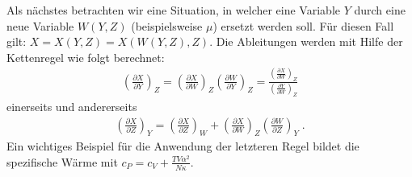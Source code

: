 Als nächstes betrachten wir eine Situation, in welcher eine Variable $Y$ durch eine neue Variable $W(Y,Z)$ (beispielsweise $\mu$) ersetzt werden soll.
Für diesen Fall gilt: $X=X(Y,Z)=X(W(Y,Z),Z)$. 	
Die Ableitungen werden mit Hilfe der Kettenregel wie folgt berechnet:
\begin{align*}
	\boxed{\left(\frac{\partial X}{\partial Y}\right)_Z=\left(\frac{\partial X}{\partial W}\right)_Z\left(\frac{\partial W}{\partial Y}\right)_Z=\frac{\left(\frac{\partial X}{\partial W}\right)_Z}{\left(\frac{\partial Y}{\partial W}\right)_Z}}
\end{align*}
einerseits und andererseits
\begin{align*}
	\boxed{\left(\frac{\partial X}{\partial Z}\right)_Y=\left(\frac{\partial X}{\partial Z}\right)_W+\left(\frac{\partial X}{\partial W}\right)_Z\left(\frac{\partial W}{\partial Z}\right)_Y}\;.
\end{align*}
Ein wichtiges Beispiel für die Anwendung der letzteren Regel bildet die spezifische Wärme mit $c_P=c_V+\frac{TV\alpha^2}{N\kappa}$.
